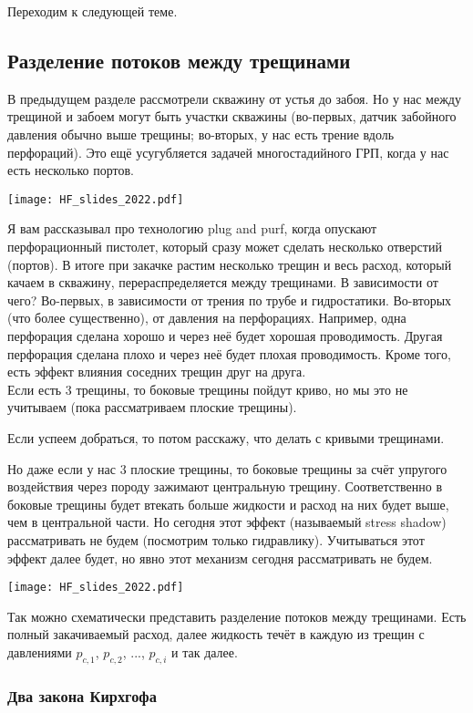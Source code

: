 \documentclass[main.tex]{subfiles}
\begin{document}
Переходим к следующей теме.

\subsection{Разделение потоков между трещинами}

В предыдущем разделе рассмотрели скважину от устья до забоя.
Но у нас между трещиной и забоем могут быть участки скважины (во-первых, датчик забойного давления обычно выше трещины; во-вторых, у нас есть трение вдоль перфораций).
Это ещё усугубляется задачей многостадийного ГРП, когда у нас есть несколько портов.

\texttt{[image: HF\_slides\_2022.pdf]}

Я вам рассказывал про технологию plug and purf, когда опускают перфорационный пистолет, который сразу может сделать несколько отверстий (портов).
В итоге при закачке растим несколько трещин и весь расход, который качаем в скважину, перераспределяется между трещинами.
В зависимости от чего?
Во-первых, в зависимости от трения по трубе и гидростатики.
Во-вторых (что более существенно), от давления на перфорациях.
Например, одна перфорация сделана хорошо и через неё будет хорошая проводимость.
Другая перфорация сделана плохо и через неё будет плохая проводимость.
Кроме того, есть эффект влияния соседних трещин друг на друга.
\\

Если есть 3 трещины, то боковые трещины пойдут криво, но мы это не учитываем (пока рассматриваем плоские трещины).

Если успеем добраться, то потом расскажу, что делать с кривыми трещинами.

Но даже если у нас 3 плоские трещины, то боковые трещины за счёт упругого воздействия через породу зажимают центральную трещину.
Соответственно в боковые трещины будет втекать больше жидкости и расход на них будет выше, чем в центральной части.
Но сегодня этот эффект (называемый stress shadow) рассматривать не будем (посмотрим только гидравлику).
Учитываться этот эффект далее будет, но явно этот механизм сегодня рассматривать не будем.

\texttt{[image: HF\_slides\_2022.pdf]}

Так можно схематически представить разделение потоков между трещинами.
Есть полный закачиваемый расход, далее жидкость течёт в каждую из трещин с давлениями $p_{c,1}$, $p_{c,2}$, ..., $p_{c,i}$ и так далее.

\subsubsection{Два закона Кирхгофа}
\end{document}
